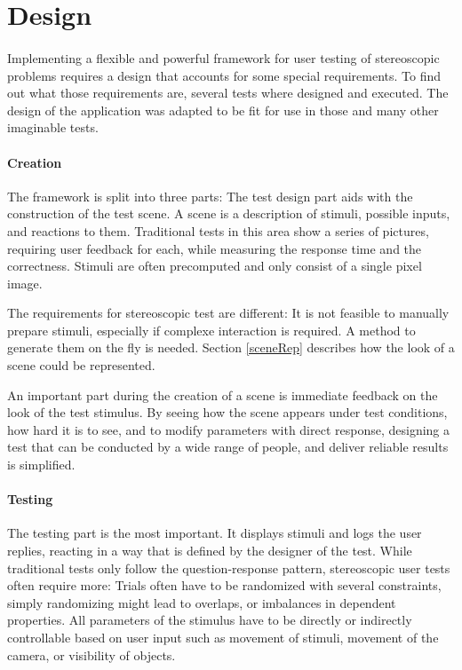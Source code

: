 \section{Design\label{Design}}
\paragraph{}
Implementing a flexible and powerful framework for user testing of stereoscopic problems requires a design that accounts for some special requirements. To find out what those requirements are, several tests where designed and executed. The design of the application was adapted to be fit for use in those and many other imaginable tests.

\paragraph{Creation}
The framework is split into three parts: The test design part aids with the construction of the test scene. A scene is a description of stimuli, possible inputs, and reactions to them. Traditional tests in this area show a series of pictures, requiring user feedback for each, while measuring the response time and the correctness. Stimuli are often precomputed and only consist of a single pixel image.

The requirements for stereoscopic test are different: It is not feasible to manually prepare stimuli, especially if complexe interaction is required. A method to generate them on the fly is needed.
Section \ref{sceneRep} describes how the look of a scene could be represented.

An important part during the creation of a scene is immediate feedback on the look of the test stimulus.
By seeing how the scene appears under test conditions, how hard it is to see, and to modify parameters with direct response,
designing a test that can be conducted by a wide range of people, and deliver reliable results is simplified.

\paragraph{Testing}
The testing part is the most important. It displays stimuli and logs the user replies, reacting in a way that is defined by the designer of the test. While traditional tests only follow the question-response pattern, stereoscopic user tests often require more: Trials often have to be randomized with several constraints, simply randomizing might lead to overlaps, or imbalances in dependent properties. All parameters of the stimulus have to be directly or indirectly controllable based on user input such as movement of stimuli, movement of the camera, or visibility of objects.

